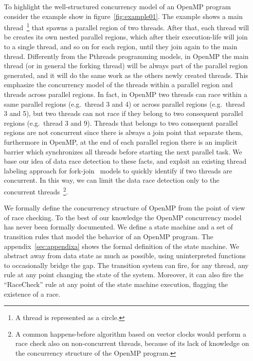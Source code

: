 To highlight the well-structured concurrency model of an OpenMP program
consider the example show in figure~\ref{fig:example01}.
%
The example shows a main thread~\footnote{A thread is represented as a
  circle.} that spawns a parallel region of two threads.
%
After that, each thread will be creates its own nested parallel regions, which
after their execution-life will join to a single thread, and so on for each
region, until they join again to the main thread.
%
Differently from the Pthreads programming models, in OpenMP the main thread
(or in general the forking thread) will be always part of the parallel region
generated, and it will do the same work as the others newly created threads.
%
This emphasize the concurrency model of the threads within a parallel region
and threads across parallel regions.
%
In fact, in OpenMP two threads can race within a same parallel regions (e.g.\
thread 3 and 4) or across parallel regions (e.g.\ thread 3 and 5), but two
threads can not race if they belong to two consequent parallel regions (e.g.\
thread 3 and 9).
%
Threads that belongs to two consequent parallel regions are not concurrent
since there is always a join point that separate them, furthermore in OpenMP,
at the end of each parallel region there is an implicit barrier which
synchronizes all threads before starting the next parallel task.
%
We base our idea of data race detection to these facts, and exploit an
existing thread labeling approach for
fork-join~\cite{Mellor-Crummey:1991:ODD:125826.125861} models to quickly
identify if two threads are concurrent.
%
In this way, we can limit the data race detection only to the concurrent
threads~\footnote{A common happens-before algorithm based on vector clocks
  would perform a race check also on non-concurrent threads, because of its
  lack of knowledge on the concurrency structure of the OpenMP program.}.

We formally define the concurrency structure of OpenMP from the point of view
of race checking.
%
To the best of our knowledge the OpenMP concurrency model has never been
formally documented.
%
We define a state machine and a set of transition rules that model the
behavior of an OpenMP program.                            
%
The appendix~\ref{sec:appendixa} shows the formal definition of the state
machine.
%
We abstract away from data state as much as possible, using uninterpreted
functions to occasionally bridge the gap.
%
The transition system can fire, for any thread, any rule at any point changing
the state of the system.
%
Moreover, it can also fire the ``RaceCheck'' rule at any point of the state
machine execution, flagging the existence of a race.

